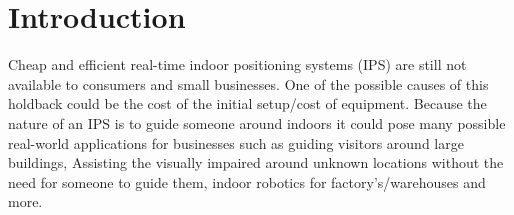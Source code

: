 \section{Introduction }\label{sec:intro}
Cheap and efficient real-time indoor positioning systems (IPS) are still not available to consumers and small businesses. One of the possible causes of this holdback could be the cost of the initial setup/cost of equipment. Because the nature of an IPS is to guide someone around indoors it could pose many possible real-world applications for businesses such as guiding visitors around large buildings, Assisting the visually impaired around unknown locations without the need for someone to guide them, indoor robotics for factory’s/warehouses and more.